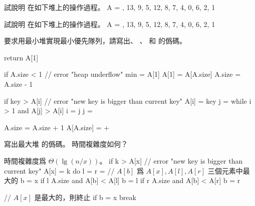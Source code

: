 \startsection[
  title={Priority queues},
]

\startEXERCISE
試說明  在如下堆上的操作過程。
\startformula
A = , 13, 9, 5, 12, 8, 7, 4, 0, 6, 2, 1 \rangle
\stopformula
\stopEXERCISE

\startANSWER
\startcombination[2*2]
{\externalfigure[output/e6_5_1-1]}{}
{\externalfigure[output/e6_5_1-2]}{}
{\externalfigure[output/e6_5_1-3]}{}
\stopcombination
\stopANSWER

\startEXERCISE
試說明  在如下堆上的操作過程。
\startformula
A = , 13, 9, 5, 12, 8, 7, 4, 0, 6, 2, 1 \rangle
\stopformula
\stopEXERCISE

\startANSWER
\startcombination[2*2]
{\externalfigure[output/e6_5_2-1]}{}
{\externalfigure[output/e6_5_2-2]}{}
{\externalfigure[output/e6_5_2-3]}{}
\stopcombination
\stopANSWER

\startEXERCISE
要求用最小堆實現最小優先隊列，請寫出、
、 和  的僞碼。
\stopEXERCISE

\startANSWER
{}
\startCLRSCODE
return A[1]
\stopCLRSCODE

\startCLRSCODE
if A.size < 1
	// error "heap underflow"
min = A[1]
A[1] = A[A.size]
A.size = A.size - 1
\stopCLRSCODE

\startCLRSCODE
if key > A[i]
	// error "new key is bigger than current key"
A[i] = key
j = 
while i > 1 and A[j] > A[i]
	i = j
	j = 
\stopCLRSCODE

\startCLRSCODE
A.size = A.size + 1
A[A.size] = +\infty
{}
\stopCLRSCODE
\stopANSWER

\startEXERCISE
寫出最大堆  的僞碼。
時間複雜度如何？
\stopEXERCISE

\startANSWER
時間複雜度爲 $\Theta(\lg (n/x))$。
\startCLRSCODE
if k > A[x]
	// error "new key is bigger than current key"
A[x] = k
do
	l = 
	r = 
	// $A[b]$ 爲 $A[x],A[l],A[r]$ 三個元素中最大的
	b = x
	if l \le A.size and A[b] < A[l]
		b = l
	if r \le A.size and A[b] < A[r]
		b = r

	// $A[x]$ 是最大的，則終止
	if b = x
		break

